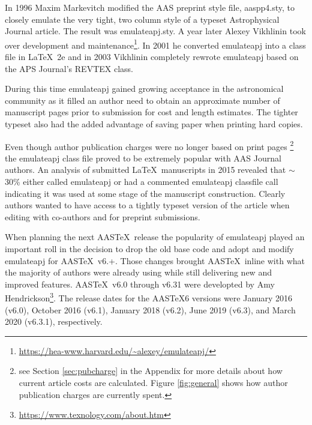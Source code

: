 \documentclass[linenumbers,trackchanges]{aastex701}
\newcommand\aastex{AAS\TeX}
\newcommand\latex{La\TeX}
\begin{document}
In 1996 Maxim Markevitch modified the AAS preprint style file, aaspp4.sty,
to closely emulate the very tight, two column style of a typeset
Astrophysical Journal article.  The result was emulateapj.sty. A year
later Alexey Vikhlinin took over development and maintenance\footnote{\url{https://hea-www.harvard.edu/~alexey/emulateapj/}}. In 2001 he
converted emulateapj into a class file in \latex\ 2e and in 2003 Vikhlinin
completely rewrote emulateapj based on the APS Journal's REVTEX class.

During this time emulateapj gained growing acceptance in the astronomical
community as it filled an author need to obtain an approximate number of
manuscript pages prior to submission for cost and length estimates. The
tighter typeset also had the added advantage of saving paper when printing 
hard copies.

\begin{figure*}[ht!]
\caption{The AAS journals are operated as a nonprofit venture, and author charges fairly recapture costs for the services provided in the publishing process. The chart above breaks down the services that author charges go toward. The AAS Journals' Business Model is outlined in a \href{https://aas.org/posts/news/2023/08/aas-open-access-publishing-model-open-transparent-and-fair}{2023 post}.
\label{fig:general}}
\end{figure*}

Even though author publication charges were no longer based on print pages
\footnote{see Section \ref{sec:pubcharge} in the Appendix for more details
about how current article costs are calculated. Figure \ref{fig:general} shows
how author publication charges are currently spent.} the emulateapj class file
proved to be extremely popular with AAS Journal authors.  An 
analysis of submitted \latex\ manuscripts in 2015 revealed that $\sim$30\%
either called emulateapj or had a commented emulateapj classfile call
indicating it was used at some stage of the manuscript construction.
Clearly authors wanted to have access to a tightly typeset version of the
article when editing with co-authors and for preprint submissions.

When planning the next \aastex\ release the popularity of emulateapj played
an important roll in the decision to drop the old base code and adopt and
modify emulateapj for \aastex\ v6.+.  Those changes brought \aastex\
inline with what the majority of authors were already using while still
delivering new and improved features.  \aastex\ v6.0 through v6.31 were
developted by Amy Hendrickson\footnote{\url{https://www.texnology.com/about.htm}}.
The release dates for the \aastex 6 versions were January 2016 (v6.0),
October 2016 (v6.1), January 2018 (v6.2), June 2019 (v6.3), and March 2020
(v6.3.1), respectively.
\end{document}
